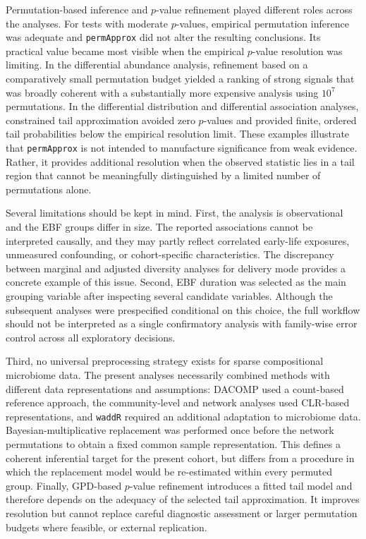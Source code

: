 Permutation-based inference and $p$-value refinement played different roles across the analyses. For tests with moderate $p$-values, empirical permutation inference was adequate and \texttt{permApprox} did not alter the resulting conclusions. Its practical value became most visible when the empirical $p$-value resolution was limiting. In the differential abundance analysis, refinement based on a comparatively small permutation budget yielded a ranking of strong signals that was broadly coherent with a substantially more expensive analysis using $10^7$ permutations. In the differential distribution and differential association analyses, constrained tail approximation avoided zero $p$-values and provided finite, ordered tail probabilities below the empirical resolution limit. These examples illustrate that \texttt{permApprox} is not intended to manufacture significance from weak evidence. Rather, it provides additional resolution when the observed statistic lies in a tail region that cannot be meaningfully distinguished by a limited number of permutations alone.

Several limitations should be kept in mind. First, the analysis is observational and the EBF groups differ in size. The reported associations cannot be interpreted causally, and they may partly reflect correlated early-life exposures, unmeasured confounding, or cohort-specific characteristics. The discrepancy between marginal and adjusted diversity analyses for delivery mode provides a concrete example of this issue. Second, EBF duration was selected as the main grouping variable after inspecting several candidate variables. Although the subsequent analyses were prespecified conditional on this choice, the full workflow should not be interpreted as a single confirmatory analysis with family-wise error control across all exploratory decisions.

\newpage
Third, no universal preprocessing strategy exists for sparse compositional microbiome data. The present analyses necessarily combined methods with different data representations and assumptions: DACOMP used a count-based reference approach, the community-level and network analyses used CLR-based representations, and \texttt{waddR} required an additional adaptation to microbiome data. Bayesian-multiplicative replacement was performed once before the network permutations to obtain a fixed common sample representation. This defines a coherent inferential target for the present cohort, but differs from a procedure in which the replacement model would be re-estimated within every permuted group. Finally, GPD-based $p$-value refinement introduces a fitted tail model and therefore depends on the adequacy of the selected tail approximation. It improves resolution but cannot replace careful diagnostic assessment or larger permutation budgets where feasible, or external replication.

